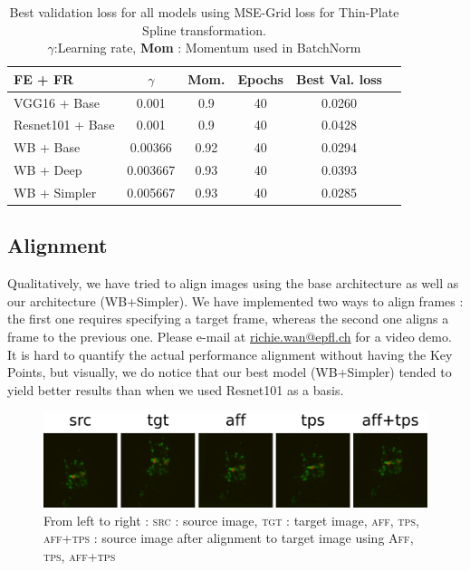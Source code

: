 \documentclass[10pt,conference,compsocconf]{IEEEtran}
\begin{document}
\vspace{-0.35cm}
\begin{table}[h!]
  \centering
  \caption{Best validation loss for all models using MSE-Grid loss for Thin-Plate Spline transformation.\\
  \textbf{$\gamma$}:Learning rate, \textbf{Mom} : Momentum used in BatchNorm}
  \vspace{-0.2cm}
  \begin{tabular}{|l||c|c|c|c|c|}
      \hline
      \textbf{FE + FR} & \textbf{$\gamma$} & \textbf{Mom.} & \textbf{Epochs} & \textbf{Best Val. loss}\\ \hline\hline
      VGG16 + Base & 0.001 & 0.9 & 40 & 0.0260 \\ \hline
      Resnet101 + Base & 0.001 & 0.9 & 40 & 0.0428\\ \hline
      WB + Base &  0.00366 & 0.92  & 40 & 0.0294\\ \hline
      WB + Deep &  0.003667 & 0.93 & 40 & 0.0393\\ \hline
      WB + Simpler &  0.005667 & 0.93 & 40 & 0.0285\\ \hline
  \end{tabular}
  \label{tab:validation}
\end{table} 
\vspace{-0.3cm}

\subsection{Alignment}
Qualitatively, we have tried to align images using the base architecture as well as our architecture (WB+Simpler). We have implemented two ways to align frames : the first one requires specifying a target frame, whereas the second one aligns a frame to the previous one. Please e-mail at \url{richie.wan@epfl.ch} for a video demo. It is hard to quantify the actual performance alignment without having the Key Points, but visually, we do notice that our best model (WB+Simpler) tended to yield better results than when we used Resnet101 as a basis.
\vspace{-0.1cm}
\begin{figure}[h!]
    \centering
    \includegraphics[scale = 0.274]{demo_worm_brains.png}
    \vspace{-0.3cm}
    \caption{From left to right : \textsc{src} : source image, \textsc{tgt} : target image, \textsc{aff, tps, aff+tps} : source image after alignment to target image using \textsc{Aff}, \textsc{tps}, \textsc{aff+tps}}
    \label{fig:demo_worm_brains}
\end{figure}
\vspace{-0.25cm}
\end{document}
